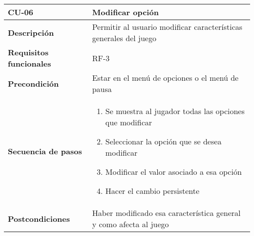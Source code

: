 \begin{tabularx}{\columnwidth}{l|l}
\begin{minipage}{0.25\columnwidth}
\textbf{CU-06} 
\end{minipage}
&
\begin{minipage}{0.65\columnwidth}
Modificar opción
\end{minipage}
\\ \hline

\begin{minipage}{0.25\columnwidth}
\textbf{Descripción} 
\end{minipage}
&
\begin{minipage}{0.65\columnwidth}
Permitir al usuario modificar características generales del juego
\end{minipage}
\\ \hline

\begin{minipage}{0.25\columnwidth}
\textbf{Requisitos funcionales} 
\end{minipage}
&
\begin{minipage}{0.65\columnwidth}
RF-3
\end{minipage}
\\ \hline

\begin{minipage}{0.25\columnwidth}
\textbf{Precondición} 
\end{minipage}
&
\begin{minipage}{0.65\columnwidth}
Estar en el menú de opciones o el menú de pausa
\end{minipage}
\\ \hline

\begin{minipage}{0.25\columnwidth}
\textbf{Secuencia de pasos} 
\end{minipage}
&
\begin{minipage}{0.65\columnwidth}
\begin{enumerate}
\item
Se muestra al jugador todas las opciones que modificar
\item
Seleccionar la opción que se desea modificar
\item
Modificar el valor asociado a esa opción
\item
Hacer el cambio persistente
\end{enumerate}
\end{minipage}
\\ \hline

\begin{minipage}{0.25\columnwidth}
\textbf{Postcondiciones} 
\end{minipage}
&
\begin{minipage}{0.65\columnwidth}
Haber modificado esa característica general y como afecta al juego
\end{minipage}
\\ \hline


\end{tabularx}
